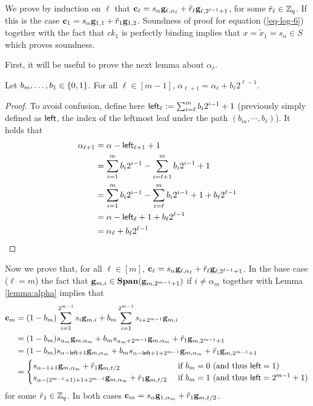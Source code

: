 We prove by induction on \(\ell\) that \(\mathbf{c}_\ell= s_\alpha\mathbf{g}_{\ell,\alpha_\ell}+\tilde{r}_{\ell}\mathbf{g}_{\ell,2^{\ell-1}+1}\), for some $\tilde{r}_\ell\in\mathbb{Z}_q$. If this is the case $\mathbf{c}_1=s_\alpha\mathbf{g}_{1,1}+\tilde{r}_{1}\mathbf{g}_{1,2}$. Soundness of proof for equation (\ref{eq-log-6}) together with the fact that \(ck_1\) is perfectly binding implies that \(x=\tilde{x}_{1}=s_{\alpha}\in S\) which proves soundness.

First, it will be useful to prove the next lemma about $\alpha_\ell$.
\begin{lemma} Let $b_m,\ldots,b_1\in\{0,1\}$. For all $\ell\in[m-1]$, $\alpha_{\ell+1}=\alpha_{\ell}+b_\ell2^{\ell-1}$.
\label{lemma:alpha}
\end{lemma}
\begin{proof}
To avoid confusion, define here ${\mathsf{left}}_\ell:=\sum_{i=\ell}^m b_i2^{i-1}+1$ (previously simply defined as ${\mathsf{left}}$, the index of the leftmost leaf under the path $(b_m,\cdots, b_\ell)$). It holds that
\begin{align*}
\alpha_{\ell+1} &= \alpha - {\mathsf{left}}_{\ell+1} + 1\\
&= \sum_{i=1}^{m} b_i2^{i-1} - \sum_{i=\ell+1}^{m}b_i2^{i-1} +1\\
&= \sum_{i=1}^{m} b_i2^{i-1} - \sum_{i=\ell}^{m}b_i2^{i-1} +1 +b_\ell2^{\ell-1}\\
&= \alpha - {\mathsf{left}}_\ell +1 +b_\ell2^{\ell-1}\\
&=\alpha_\ell+b_\ell2^{\ell-1}
\end{align*}
\end{proof}

Now we prove that, for all $\ell\in[m]$, \(\mathbf{c}_\ell= s_\alpha\mathbf{g}_{\ell,\alpha_\ell}+\tilde{r}_{\ell}\mathbf{g}_{\ell,2^{\ell-1}+1}\).
In the base case ($\ell=m$) the fact that \(\mathbf{g}_{m,i}\in\mathbf{Span}(\mathbf{g}_{m,2^{m-1}+1})\) if \(i\neq \alpha_m\) together with Lemma \ref{lemma:alpha} implies that 
\begin{align*}
\mathbf{c}_m &= (1-b_m)\sum_{i=1}^{2^{m-1}}s_i \mathbf{g}_{m,i}+b_m\sum_{i=1}^{2^{m-1}}s_{i+2^{m-1}}\mathbf{g}_{m,i}\\
&= (1-b_m)s_{\alpha_m}\mathbf{g}_{m,\alpha_m} +b_ms_{\alpha_m+2^{m-1}}\mathbf{g}_{m,\alpha_m}+\tilde{r}_1\mathbf{g}_{m,2^{m-1}+1}\\
&= (1-b_m)s_{\alpha-{\mathsf{left}}+1}\mathbf{g}_{m,\alpha_m} +b_ms_{\alpha-{\mathsf{left}}+1+2^{m-1}}\mathbf{g}_{m,\alpha_m}+\tilde{r}_1\mathbf{g}_{m,2^{m-1}+1}\\
&=\begin{cases}
    s_{\alpha-1+1}\mathbf{g}_{m,\alpha_m}+\tilde{r}_1\mathbf{g}_{m,t/2} & \text{ if } b_m=0 \ (\text{and thus }{\mathsf{left}}=1) \\
    s_{\alpha-(2^{m-1}+1)+1+2^{m-1}}\mathbf{g}_{m,\alpha_m}+\tilde{r}_1\mathbf{g}_{m,t/2} & \text{ if } b_m=1 \ (\text{and thus }{\mathsf{left}}=2^{m-1}+1) 
\end{cases}
\end{align*}
for some \(\tilde{r}_1\in\mathbb{Z}_q\). In both cases $\mathbf{c}_m=s_\alpha\mathbf{g}_{1,\alpha_m}+\tilde{r}_1\mathbf{g}_{m,t/2}$.

